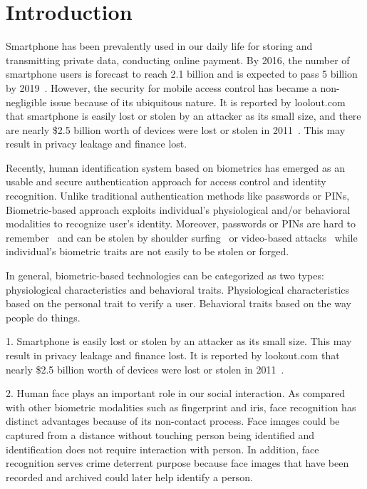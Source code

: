 \section{Introduction}
    Smartphone has been prevalently used in our daily life for storing and transmitting private data, conducting online payment. By 2016, the number of smartphone users is forecast to reach 2.1 billion and is expected to pass 5 billion by 2019~\cite{worldwide2016smartphonUsage}. However, the security for mobile access control has became a non-negligible issue because of its ubiquitous nature. It is reported by loolout.com that smartphone is easily lost or stolen by an attacker as its small size, and there are nearly \$2.5 billion worth of devices were lost or stolen in 2011~\cite{lookout-survey}. This may result in privacy leakage and finance lost.

    Recently, human identification system based on biometrics has emerged as an usable and secure authentication approach for access control and identity recognition. Unlike traditional authentication methods like passwords or PINs, Biometric-based approach exploits individual's physiological and/or behavioral modalities to recognize user's identity. Moreover, passwords or PINs are hard to remember~\cite{DeAngeli:2005:PRW:1090412.1090419} and can be stolen by shoulder surfing~\cite{Kwon2014Covert,shoulder} or video-based attacks~\cite{shukla2014beware,yue2014blind} while individual's biometric traits are not easily to be stolen or forged.

    In general, biometric-based technologies can be categorized as two types: physiological characteristics and behavioral traits. Physiological characteristics based on the personal trait to verify a user. Behavioral traits based on the way people do things.

1. Smartphone is easily lost or stolen by an attacker as its small size. This may result in privacy leakage and finance lost. It is reported by lookout.com that nearly \$2.5 billion worth of devices were lost or stolen in 2011~\cite{lookout-survey}.

2. Human face plays an important role in our social interaction. As compared with other biometric modalities such as fingerprint and iris, face recognition has distinct advantages because of its non-contact process. Face images could be captured from a distance without touching person being identified and identification does not require interaction with person. In addition, face recognition serves crime deterrent purpose because face images that have been recorded and archived could later help identify a person.

